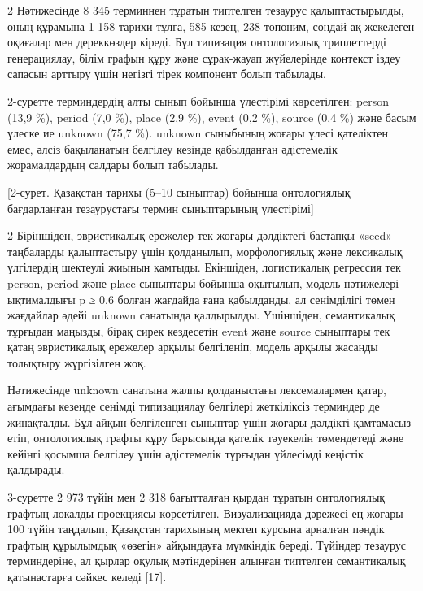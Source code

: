 \begin{multicols}{2}
Нәтижесінде 8 345 терминнен тұратын типтелген тезаурус қалыптастырылды,
оның құрамына 1 158 тарихи тұлға, 585 кезең, 238 топоним, сондай-ақ
жекелеген оқиғалар мен дереккөздер кіреді. Бұл типизация онтологиялық
триплеттерді генерациялау, білім графын құру және сұрақ-жауап
жүйелерінде контекст іздеу сапасын арттыру үшін негізгі тірек компонент
болып табылады.

2-суретте терминдердің алты сынып бойынша үлестірімі көрсетілген: person
(13,9 \%), period (7,0 \%), place (2,9 \%), event (0,2 \%), source (0,4
\%) және басым үлеске ие unknown (75,7 \%). unknown сыныбының жоғары
үлесі қателіктен емес, әлсіз бақыланатын белгілеу кезінде қабылданған
әдістемелік жорамалдардың салдары болып табылады.
\end{multicols}

[2-сурет. Қазақстан тарихы (5--10 сыныптар) бойынша онтологиялық
бағдарланған тезаурустағы термин сыныптарының үлестірімі]

\begin{multicols}{2}
Біріншіден, эвристикалық ережелер тек жоғары дәлдіктегі бастапқы «seed»
таңбаларды қалыптастыру үшін қолданылып, морфологиялық және лексикалық
үлгілердің шектеулі жиынын қамтыды. Екіншіден, логистикалық регрессия
тек person, period және place сыныптары бойынша оқытылып, модель
нәтижелері ықтималдығы p ≥ 0,6 болған жағдайда ғана қабылданды, ал
сенімділігі төмен жағдайлар әдейі unknown санатында қалдырылды.
Үшіншіден, семантикалық тұрғыдан маңызды, бірақ сирек кездесетін event
және source сыныптары тек қатаң эвристикалық ережелер арқылы белгіленіп,
модель арқылы жасанды толықтыру жүргізілген жоқ.

Нәтижесінде unknown санатына жалпы қолданыстағы лексемалармен қатар,
ағымдағы кезеңде сенімді типизациялау белгілері жеткіліксіз терминдер де
жинақталды. Бұл айқын белгіленген сыныптар үшін жоғары дәлдікті
қамтамасыз етіп, онтологиялық графты құру барысында қателік тәуекелін
төмендетеді және кейінгі қосымша белгілеу үшін әдістемелік тұрғыдан
үйлесімді кеңістік қалдырады.

3-суретте 2 973 түйін мен 2 318 бағытталған қырдан тұратын онтологиялық
графтың локалды проекциясы көрсетілген. Визуализацияда дәрежесі ең
жоғары 100 түйін таңдалып, Қазақстан тарихының мектеп курсына арналған
пәндік графтың құрылымдық «өзегін» айқындауға мүмкіндік береді. Түйіндер
тезаурус терминдеріне, ал қырлар оқулық мәтіндерінен алынған типтелген
семантикалық қатынастарға сәйкес келеді {[}17{]}.
\end{multicols}

